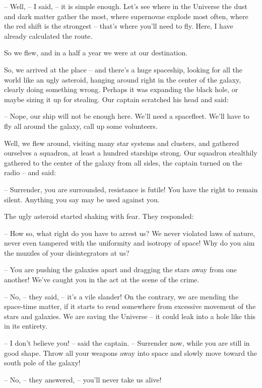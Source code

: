 \documentclass[ebook,twoside,final,openright]{memoir}
\begin{document}
– Well, – I said, – it is simple enough. Let's see where in the Universe the dust and dark matter gather the most, where supernovae explode most often, where the red shift is the strongest – that’s where you’ll need to fly. Here, I have already calculated the route.\par
So we flew, and in a half a year we were at our destination.\par
\par
So, we arrived at the place – and there’s a huge spaceship, looking for all the world like an ugly asteroid, hanging around right in the center of the galaxy, clearly doing something wrong. Perhaps it was expanding the black hole, or maybe sizing it up for stealing. Our captain scratched his head and said:\par
– Nope, our ship will not be enough here. We’ll need a spacefleet. We'll have to fly all around the galaxy, call up some volunteers.\par
Well, we flew around, visiting many star systems and clusters, and gathered ourselves a squadron, at least a hundred starships strong. Our squadron stealthily gathered to the center of the galaxy from all sides, the captain turned on the radio – and said:\par
– Surrender, you are surrounded, resistance is futile! You have the right to remain silent. Anything you say may be used against you.\par
The ugly asteroid started shaking with fear. They responded:\par
– How so, what right do you have to arrest us? We never violated laws of nature, never even tampered with the uniformity and isotropy of space! Why do you aim the muzzles of your disintegrators at us?\par
– You are pushing the galaxies apart and dragging the stars away from one another! We’ve caught you in the act at the scene of the crime.\par
– No, – they said, – it’s a vile slander! On the contrary, we are mending the space-time matter, if it starts to rend somewhere from excessive movement of the stars and galaxies. We are saving the Universe – it could leak into a hole like this in its entirety.\par
– I don’t believe you! – said the captain. – Surrender now, while you are still in good shape. Throw all your weapons away into space and slowly move toward the south pole of the galaxy!\par
– No, – they answered, – you’ll never take us alive!\par
\end{document}

